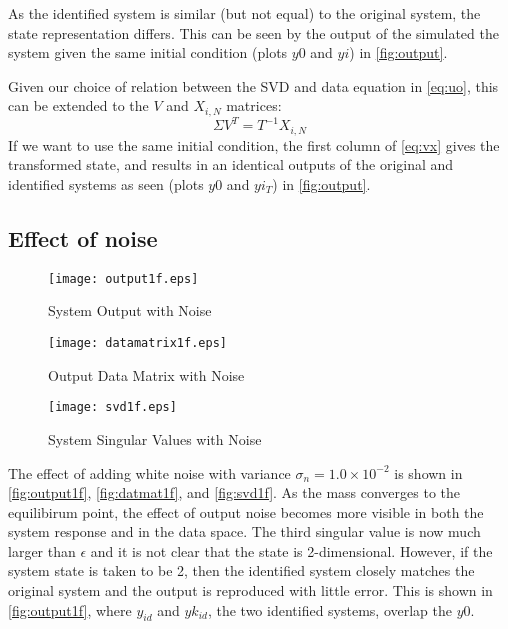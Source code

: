 \documentclass[11pt,a4paper]{article}
\begin{document}
As the identified system is similar (but not equal) to the original system, the
state representation differs. This can be seen by the output of the simulated
the system given the same initial condition (plots $y0$ and $yi$) in
\autoref{fig:output}.

Given our choice of relation between the SVD and data equation in
\autoref{eq:uo}, this can be extended to the $V$ and $X_{i, N}$ matrices:
\begin{equation}
    \label{eq:vx}
    \Sigma V^T = T^{-1} X_{i, N}
\end{equation}
If we want to use the same initial condition, the first column of
\autoref{eq:vx} gives the transformed state, and results in an identical
outputs of the original and identified systems as seen (plots $y0$ and $yi_T$)
in \autoref{fig:output}.

\subsection{Effect of noise}
\begin{figure}
    \centering
    \texttt{[image: output1f.eps]}
    \caption{System Output with Noise}
    \label{fig:output1f}
\end{figure}
\begin{figure}
    \centering
    \texttt{[image: datamatrix1f.eps]}
    \caption{Output Data Matrix with Noise}
    \label{fig:datmat1f}
\end{figure}
\begin{figure}
    \centering
    \texttt{[image: svd1f.eps]}
    \caption{System Singular Values with Noise}
    \label{fig:svd1f}
\end{figure}
The effect of adding white noise with variance $\sigma_n = 1.0 \times 10^{-2}$
is shown in \autoref{fig:output1f}, \autoref{fig:datmat1f}, and
\autoref{fig:svd1f}. As the mass converges to the equilibirum point, the effect
of output noise becomes more visible in both the system response and in the
data space. The third singular value is now much larger than $\epsilon$ and it
is not clear that the state is 2-dimensional. However, if the system state is
taken to be 2, then the identified system closely matches the original system
and the output is reproduced with little error. This is shown in
\autoref{fig:output1f}, where $y_{id}$ and $yk_{id}$, the two identified
systems, overlap the $y0$.

\end{document}
